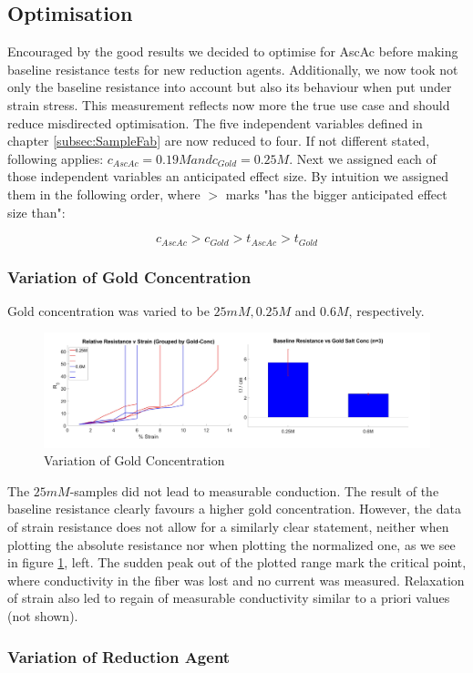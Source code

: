 \subsection{Optimisation}
Encouraged by the good results we decided to optimise for AscAc before making baseline resistance tests for new reduction agents. Additionally, we now took not only the baseline resistance into account but also its behaviour when put under strain stress. This measurement reflects now more the true use case and should reduce misdirected optimisation. The five independent variables defined in chapter \ref{subsec:SampleFab} are now reduced to four. If not different stated, following applies: $c_{AscAc} = 0.19M and c_{Gold} = 0.25M$. Next we assigned each of those independent variables an anticipated effect size. By intuition we assigned them in the following order, where $>$ marks "has the bigger anticipated effect size than":

\begin{equation}
    c_{AscAc} > c_{Gold} > t_{AscAc} > t_{Gold}
\end{equation}

\subsubsection{Variation of Gold Concentration}

Gold concentration was varied to be $25mM, 0.25M$  and $0.6M$, respectively.

\begin{figure}[hb!]
    \centerline{\includegraphics[scale=0.7]{./pic/R0vGoldConc.PNG}}
    \caption{Variation of Gold Concentration}
    \label{fig:GoldConc}
\end{figure}

The $25mM$-samples did not lead to measurable conduction. The result of the baseline resistance clearly favours a higher gold concentration. However, the data of strain resistance does not allow for a similarly clear statement, neither when plotting the absolute resistance nor when plotting the normalized one, as we see in figure \ref{fig:GoldConc}, left. The sudden peak out of the plotted range mark the critical point, where conductivity in the fiber was lost and no current was measured. Relaxation of strain also led to regain of measurable conductivity similar to a priori values (not shown).

\subsubsection{Variation of Reduction Agent}